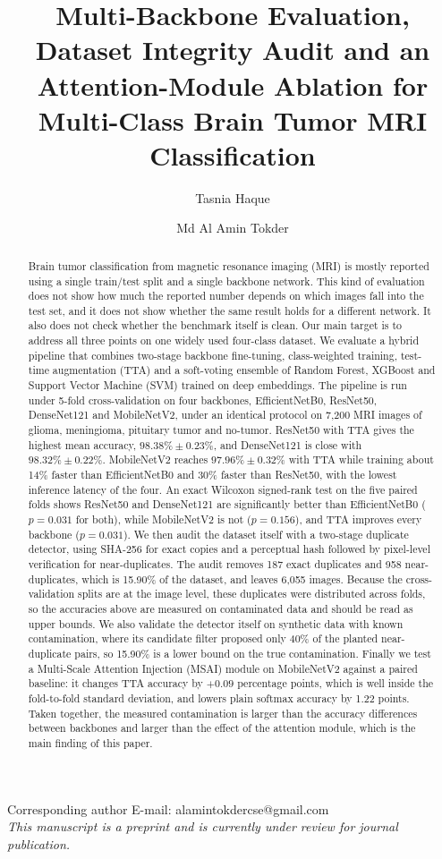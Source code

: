 \documentclass[11pt]{article}
\title{\Large Multi-Backbone Evaluation, Dataset Integrity Audit and an Attention-Module Ablation for Multi-Class Brain Tumor MRI Classification}
\author[1]{Tasnia Haque}
\author[2]{Md Al Amin Tokder}
\affil[1]{Department of Computer Science and Engineering, Rajshahi University of Engineering and Technology, Rajshahi-6204, Bangladesh}
\date{}
\begin{document}
\maketitle
\vspace{-2em}
\begin{center}
\small
Corresponding author E-mail: alamintokdercse@gmail.com\\[0.3em]
\textit{This manuscript is a preprint and is currently under review for journal publication.}
\end{center}
\vspace{1em}

\begin{abstract}
Brain tumor classification from magnetic resonance imaging (MRI) is mostly reported using a single train/test split and a single backbone network. This kind of evaluation does not show how much the reported number depends on which images fall into the test set, and it does not show whether the same result holds for a different network. It also does not check whether the benchmark itself is clean. Our main target is to address all three points on one widely used four-class dataset. We evaluate a hybrid pipeline that combines two-stage backbone fine-tuning, class-weighted training, test-time augmentation (TTA) and a soft-voting ensemble of Random Forest, XGBoost and Support Vector Machine (SVM) trained on deep embeddings. The pipeline is run under 5-fold cross-validation on four backbones, EfficientNetB0, ResNet50, DenseNet121 and MobileNetV2, under an identical protocol on 7,200 MRI images of glioma, meningioma, pituitary tumor and no-tumor. ResNet50 with TTA gives the highest mean accuracy, $98.38\% \pm 0.23\%$, and DenseNet121 is close with $98.32\% \pm 0.22\%$. MobileNetV2 reaches $97.96\% \pm 0.32\%$ with TTA while training about 14\% faster than EfficientNetB0 and 30\% faster than ResNet50, with the lowest inference latency of the four. An exact Wilcoxon signed-rank test on the five paired folds shows ResNet50 and DenseNet121 are significantly better than EfficientNetB0 ($p = 0.031$ for both), while MobileNetV2 is not ($p = 0.156$), and TTA improves every backbone ($p = 0.031$). We then audit the dataset itself with a two-stage duplicate detector, using SHA-256 for exact copies and a perceptual hash followed by pixel-level verification for near-duplicates. The audit removes 187 exact duplicates and 958 near-duplicates, which is 15.90\% of the dataset, and leaves 6,055 images. Because the cross-validation splits are at the image level, these duplicates were distributed across folds, so the accuracies above are measured on contaminated data and should be read as upper bounds. We also validate the detector itself on synthetic data with known contamination, where its candidate filter proposed only 40\% of the planted near-duplicate pairs, so 15.90\% is a lower bound on the true contamination. Finally we test a Multi-Scale Attention Injection (MSAI) module on MobileNetV2 against a paired baseline: it changes TTA accuracy by $+0.09$ percentage points, which is well inside the fold-to-fold standard deviation, and lowers plain softmax accuracy by 1.22 points. Taken together, the measured contamination is larger than the accuracy differences between backbones and larger than the effect of the attention module, which is the main finding of this paper.

\end{abstract}
\end{document}
